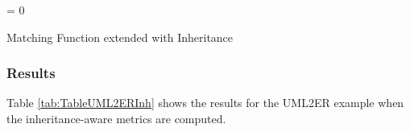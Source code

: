\begin{algorithm}[h]





\KwIn{\C, \R}
\KwOut{\vAbs}

\BlankLine
\vAbs = 0
\Return \vAbs
\BlankLine
\caption{Matching Function extended with Inheritance}
\label{alg:inheritance}
\end{algorithm}


\subsubsection{Results}

Table \ref{tab:TableUML2ERInh} shows the results for the UML2ER example when the inheritance-aware metrics are computed.

